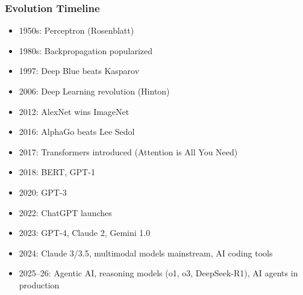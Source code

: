 

\begin{frame}[fragile]\frametitle{Evolution Timeline}
\begin{itemize}
\item 1950s: Perceptron (Rosenblatt)
\item 1980s: Backpropagation popularized
\item 1997: Deep Blue beats Kasparov
\item 2006: Deep Learning revolution (Hinton)
\item 2012: AlexNet wins ImageNet
\item 2016: AlphaGo beats Lee Sedol
\item 2017: Transformers introduced (Attention is All You Need)
\item 2018: BERT, GPT-1
\item 2020: GPT-3
\item 2022: ChatGPT launches
\item 2023: GPT-4, Claude 2, Gemini 1.0
\item 2024: Claude 3/3.5, multimodal models mainstream, AI coding tools
\item 2025--26: Agentic AI, reasoning models (o1, o3, DeepSeek-R1), AI agents in production
\end{itemize}
\end{frame}


